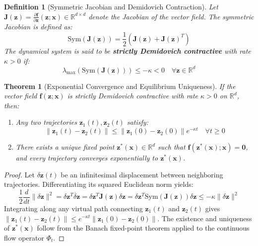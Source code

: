 \documentclass[11pt,a4paper]{article}
\newtheorem{theorem}{Theorem}
\newtheorem{definition}{Definition}
\begin{document}
\begin{definition}[Symmetric Jacobian and Demidovich Contraction]
Let $\mathbf{J}(\mathbf{z}) = \frac{\partial \mathbf{f}}{\partial \mathbf{z}}(\mathbf{z}; \mathbf{x}) \in \mathbb{R}^{d \times d}$ denote the Jacobian of the vector field. The symmetric Jacobian is defined as:
\begin{equation}
\text{Sym}(\mathbf{J}(\mathbf{z})) = \frac{1}{2}\left(\mathbf{J}(\mathbf{z}) + \mathbf{J}(\mathbf{z})^T\right)
\end{equation}
The dynamical system is said to be \textbf{strictly Demidovich contractive} with rate $\kappa > 0$ if:
\begin{equation}
\lambda_{\max}\left(\text{Sym}(\mathbf{J}(\mathbf{z}))\right) \le -\kappa < 0 \quad \forall \mathbf{z} \in \mathbb{R}^d
\end{equation}
\end{definition}

\begin{theorem}[Exponential Convergence and Equilibrium Uniqueness]
If the vector field $\mathbf{f}(\mathbf{z}; \mathbf{x})$ is strictly Demidovich contractive with rate $\kappa > 0$ on $\mathbb{R}^d$, then:
\begin{enumerate}
    \item Any two trajectories $\mathbf{z}_1(t), \mathbf{z}_2(t)$ satisfy:
    \begin{equation}
    \|\mathbf{z}_1(t) - \mathbf{z}_2(t)\| \le \|\mathbf{z}_1(0) - \mathbf{z}_2(0)\| e^{-\kappa t} \quad \forall t \ge 0
    \end{equation}
    \item There exists a unique fixed point $\mathbf{z}^*(\mathbf{x}) \in \mathbb{R}^d$ such that $\mathbf{f}(\mathbf{z}^*(\mathbf{x}); \mathbf{x}) = \mathbf{0}$, and every trajectory converges exponentially to $\mathbf{z}^*(\mathbf{x})$.
\end{enumerate}
\end{theorem}

\begin{proof}
Let $\delta \mathbf{z}(t)$ be an infinitesimal displacement between neighboring trajectories. Differentiating its squared Euclidean norm yields:
\begin{equation}
\frac{1}{2}\frac{d}{dt}\|\delta \mathbf{z}\|^2 = \delta \mathbf{z}^T \dot{\delta \mathbf{z}} = \delta \mathbf{z}^T \mathbf{J}(\mathbf{z}) \delta \mathbf{z} = \delta \mathbf{z}^T \text{Sym}(\mathbf{J}(\mathbf{z})) \delta \mathbf{z} \le -\kappa \|\delta \mathbf{z}\|^2
\end{equation}
Integrating along any virtual path connecting $\mathbf{z}_1(t)$ and $\mathbf{z}_2(t)$ gives $\|\mathbf{z}_1(t) - \mathbf{z}_2(t)\| \le e^{-\kappa t} \|\mathbf{z}_1(0) - \mathbf{z}_2(0)\|$. The existence and uniqueness of $\mathbf{z}^*(\mathbf{x})$ follow from the Banach fixed-point theorem applied to the continuous flow operator $\Phi_t$.
\end{proof}
\end{document}
